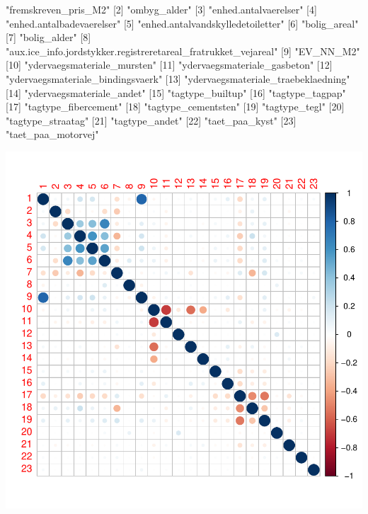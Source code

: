 \documentclass{report}
\begin{document}
\begin{Schunk}
\begin{Soutput}
 [1] "fremskreven_pris_M2"                                          
 [2] "ombyg_alder"                                                  
 [3] "enhed.antalvaerelser"                                         
 [4] "enhed.antalbadevaerelser"                                     
 [5] "enhed.antalvandskylledetoiletter"                             
 [6] "bolig_areal"                                                  
 [7] "bolig_alder"                                                  
 [8] "aux.ice_info.jordstykker.registreretareal_fratrukket_vejareal"
 [9] "EV_NN_M2"                                                     
[10] "ydervaegsmateriale_mursten"                                   
[11] "ydervaegsmateriale_gasbeton"                                  
[12] "ydervaegsmateriale_bindingsvaerk"                             
[13] "ydervaegsmateriale_traebeklaedning"                           
[14] "ydervaegsmateriale_andet"                                     
[15] "tagtype_builtup"                                              
[16] "tagtype_tagpap"                                               
[17] "tagtype_fibercement"                                          
[18] "tagtype_cementsten"                                           
[19] "tagtype_tegl"                                                 
[20] "tagtype_straatag"                                             
[21] "tagtype_andet"                                                
[22] "taet_paa_kyst"                                                
[23] "taet_paa_motorvej"                                            
\end{Soutput}
\end{Schunk}
\includegraphics{rapport_latex-005}
\end{document}
